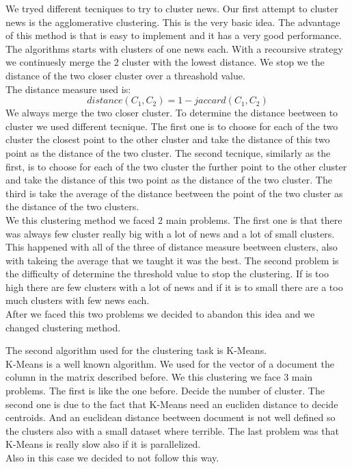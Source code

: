 \documentclass{acm_proc_article-sp}
\begin{document}
We tryed different tecniques to try to cluster news.
Our first attempt to cluster news is the agglomerative clustering. This is the very basic idea. The advantage of this method is that is easy to implement and it has a very good performance. The algorithms starts with clusters of one news each. With a recoursive strategy we continuesly merge the 2 cluster with the lowest distance. We stop we the distance of the two closer cluster over a threashold value.\\
The distance measure used is: $$ distance(C_1,C_2) = 1 - jaccard(C_1,C_2)$$
We always merge the two closer cluster. To determine the distance beetween to cluster we used different tecnique. The first one is to choose for each of the two cluster the closest point to the other cluster and take the distance of this two point as the distance of the two cluster. The second tecnique, similarly as the first, is to choose for each of the two cluster the further point to the other cluster and take the distance of this two point as the distance of the two cluster. The third is take the average of the distance beetween the point of the two cluster as the distance of the two clusters.\\
We this clustering method we faced 2 main problems. The first one is that there was always few cluster really big with a lot of news and a lot of small clusters. This happened with all of the three of distance measure beetween clusters, also with takeing the average that we taught it was the best. The second problem is the difficulty of determine the threshold value to stop the clustering. If is too high there are few clusters with a lot of news and if it is to small there are a too much clusters with few news each.\\
After we faced this two problems we decided to abandon this idea and we changed clustering method.

The second algorithm used for the clustering task is K-Means.\\
K-Means is a well known algorithm. We used for the vector of a document the column in the matrix described before. We this clustering we face 3 main problems. The first is like the one before. Decide the number of cluster. The second one is due to the fact that K-Means need an eucliden distance to decide centroids. And an euclidean distance beetween document is not well defined so the clusters also with a small dataset where terrible. The last problem was that K-Means is really slow also if it is parallelized.\\
Also in this case we decided to not follow this way.
\end{document}
